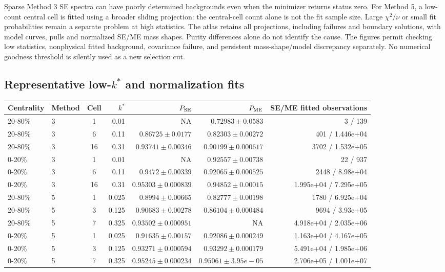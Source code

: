 \documentclass[10pt,a4paper]{article}
\begin{document}
Sparse Method 3 SE spectra can have poorly determined backgrounds even when the minimizer returns status zero. For Method 5, a low-count central cell is fitted using a broader sliding projection: the central-cell count alone is not the fit sample size. Large $\chi^2/\nu$ or small fit probabilities remain a separate problem at high statistics. The atlas retains all projections, including failures and boundary solutions, with model curves, pulls and normalized SE/ME mass shapes.
Purity differences alone do not identify the cause. The figures permit checking low statistics, nonphysical fitted background, covariance failure, and persistent mass-shape/model discrepancy separately. No numerical goodness threshold is silently used as a new selection cut.
\subsection*{Representative low-$k^*$ and normalization fits}
{\scriptsize\begin{tabular}{llcrrrr}\toprule Centrality & Method & Cell & $k^*$ & $P_{\rm SE}$ & $P_{\rm ME}$ & SE/ME fitted observations\\\midrule
20-80\% & 3 & 1 & 0.01 & NA & $0.72983\pm0.0583$ & 3 / 139\\
20-80\% & 3 & 6 & 0.11 & $0.86725\pm0.0177$ & $0.82303\pm0.00272$ & 401 / 1.446e+04\\
20-80\% & 3 & 16 & 0.31 & $0.93741\pm0.00346$ & $0.90199\pm0.000617$ & 3702 / 1.532e+05\\
0-20\% & 3 & 1 & 0.01 & NA & $0.92557\pm0.00738$ & 22 / 937\\
0-20\% & 3 & 6 & 0.11 & $0.9472\pm0.00339$ & $0.92065\pm0.000525$ & 2448 / 8.98e+04\\
0-20\% & 3 & 16 & 0.31 & $0.95303\pm0.000839$ & $0.94852\pm0.00015$ & 1.995e+04 / 7.295e+05\\
20-80\% & 5 & 1 & 0.025 & $0.8994\pm0.00665$ & $0.82777\pm0.00198$ & 1780 / 6.925e+04\\
20-80\% & 5 & 3 & 0.125 & $0.90683\pm0.00278$ & $0.86104\pm0.000484$ & 9694 / 3.93e+05\\
20-80\% & 5 & 7 & 0.325 & $0.93502\pm0.000951$ & NA & 4.918e+04 / 2.035e+06\\
0-20\% & 5 & 1 & 0.025 & $0.91635\pm0.00157$ & $0.92086\pm0.000249$ & 1.163e+04 / 4.167e+05\\
0-20\% & 5 & 3 & 0.125 & $0.93271\pm0.000594$ & $0.93292\pm0.000179$ & 5.491e+04 / 1.985e+06\\
0-20\% & 5 & 7 & 0.325 & $0.95245\pm0.000234$ & $0.95061\pm3.95e-05$ & 2.706e+05 / 1.001e+07\\
\bottomrule\end{tabular}}
\end{document}
